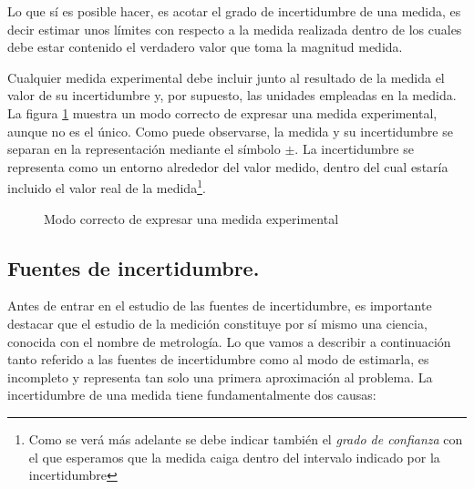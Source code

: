 Lo que sí es posible hacer, es acotar el grado de incertidumbre de una medida, es decir estimar unos límites con respecto a la medida realizada dentro de los cuales debe estar contenido el verdadero valor que toma la magnitud medida.

Cualquier medida experimental debe incluir junto al resultado de la medida el valor de su incertidumbre y, por supuesto, las unidades empleadas en la medida. La figura \ref{fig:incertidumbre} muestra un modo correcto de expresar una medida experimental, aunque no es el único. Como puede observarse, la medida y su incertidumbre se separan en la representación mediante el símbolo $\pm$.  La incertidumbre se representa como  un entorno alrededor del valor medido, dentro del cual estaría incluido el valor real de la medida\footnote{Como se verá más adelante se debe indicar también el \emph{grado de confianza} con el que esperamos que la medida caiga dentro del intervalo indicado por la incertidumbre}. 

\begin{figure}
\centering
{}
\caption{Modo correcto de expresar una medida experimental}
\label{fig:incertidumbre}
\end{figure} 

 
\subsection{Fuentes de incertidumbre.}

Antes de entrar en el estudio de las fuentes de incertidumbre, es importante destacar que el estudio de la medición constituye por sí mismo una ciencia, conocida con el nombre de metrología. Lo que vamos a describir a continuación tanto referido a las fuentes de incertidumbre como al modo de estimarla, es incompleto y representa tan solo una primera aproximación al problema.
La incertidumbre de una medida tiene fundamentalmente dos causas:

